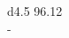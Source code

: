 \documentclass[border = 1mm]{standalone}
\begin{document}
    
\begin{tabular}{d{4.5}}
    96.12 \\
    - \\
     \\
    \hline\\
\end{tabular}
\end{document}
